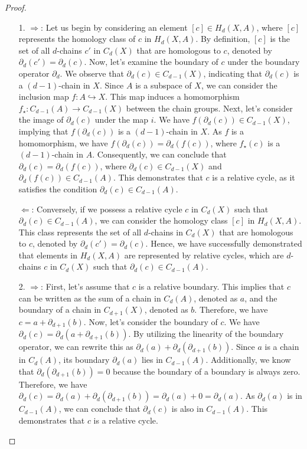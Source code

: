 \documentclass{amsart}
\begin{document}
\begin{proof}
\begin{enumerate}
	\item[]
	\item[1.] \glqq $\Rightarrow$\grqq{}: Let us begin by considering an element $[c] \in H_d(X,A)$, where $[c]$ represents the homology class of $c$ in $H_d(X,A)$. By definition, $[c]$ is the set of all $d$-chains $c'$ in $C_d(X)$ that are homologous to $c$, denoted by $\partial_d(c') = \partial_d(c)$. Now, let's examine the boundary of $c$ under the boundary operator $\partial_d$. We observe that $\partial_d(c) \in C_{d-1}(X)$, indicating that $\partial_d(c)$ is a $(d-1)$-chain in $X$. Since $A$ is a subspace of $X$, we can consider the inclusion map $f: A \hookrightarrow X$. This map induces a homomorphism $f_\star: C_{d-1}(A) \rightarrow C_{d-1}(X)$ between the chain groups. Next, let's consider the image of $\partial_d(c)$ under the map $i$. We have $f(\partial_d(c)) \in C_{d-1}(X)$, implying that $f(\partial_d(c))$ is a $(d-1)$-chain in $X$. As $f$ is a homomorphism, we have $f(\partial_d(c)) = \partial_d(f(c))$, where $f_\star(c)$ is a $(d-1)$-chain in $A$. Consequently, we can conclude that $\partial_d(c) = \partial_d(f(c))$, where $\partial_d(c) \in C_{d-1}(X)$ and $\partial_d(f(c)) \in C_{d-1}(A)$. This demonstrates that $c$ is a relative cycle, as it satisfies the condition $\partial_d(c) \in C_{d-1}(A)$.

	\glqq $\Leftarrow$\grqq{}: Conversely, if we possess a relative cycle $c$ in $C_d(X)$ such that $\partial_d(c) \in C_{d-1}(A)$, we can consider the homology class $[c]$ in $H_d(X,A)$. This class represents the set of all $d$-chains in $C_d(X)$ that are homologous to $c$, denoted by $\partial_d(c') = \partial_d(c)$. Hence, we have successfully demonstrated that elements in $H_d(X,A)$ are represented by relative cycles, which are $d$-chains $c$ in $C_d(X)$ such that $\partial_d(c) \in C_{d-1}(A)$.
	\item[2.] \glqq $\Rightarrow$\grqq{}: First, let's assume that $c$ is a relative boundary. This implies that $c$ can be written as the sum of a chain in $C_d(A)$, denoted as $a$, and the boundary of a chain in $C_{d+1}(X)$, denoted as $b$. Therefore, we have $c = a + \partial_{d+1}(b)$. Now, let's consider the boundary of $c$. We have $\partial_d(c) = \partial_d(a + \partial_{d+1}(b))$. By utilizing the linearity of the boundary operator, we can rewrite this as $\partial_d(a) + \partial_d(\partial_{d+1}(b))$. Since $a$ is a chain in $C_d(A)$, its boundary $\partial_d(a)$ lies in $C_{d-1}(A)$. Additionally, we know that $\partial_d(\partial_{d+1}(b)) = 0$ because the boundary of a boundary is always zero. Therefore, we have $\partial_d(c) = \partial_d(a) + \partial_d(\partial_{d+1}(b)) = \partial_d(a) + 0 = \partial_d(a)$. As $\partial_d(a)$ is in $C_{d-1}(A)$, we can conclude that $\partial_d(c)$ is also in $C_{d-1}(A)$. This demonstrates that $c$ is a relative cycle.


\end{enumerate}
\end{proof}
\end{document}

